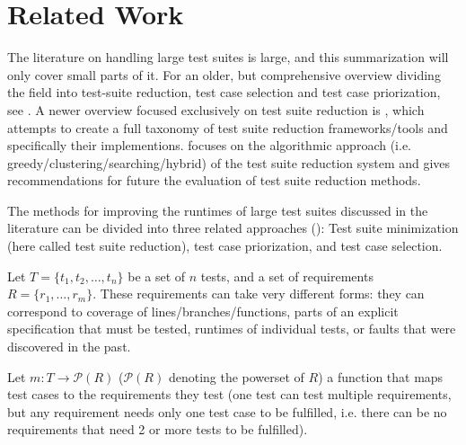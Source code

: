 
\chapter{Related Work}\label{chapter:related}


The literature on handling large test suites is large, and this
summarization will only cover small parts of it. For an older,
but comprehensive overview dividing the field into test-suite
reduction, test case selection and test case priorization, see
\cite{yoo2012regression}. A newer overview focused exclusively on test
suite reduction is \cite{khan2016survey}, which attempts to create a
full taxonomy of test suite reduction frameworks/tools and specifically
their implementions. \cite{khan2018systematic} focuses on the algorithmic
approach (i.e. greedy/clustering/searching/hybrid) of the test suite
reduction system and gives recommendations for future the evaluation of
test suite reduction methods.

The methods for improving the runtimes of large test suites discussed
in the literature can be divided into three related approaches
(\cite{yoo2012regression}): Test suite minimization (here called test
suite reduction), test case priorization, and test case selection.



Let $T=\{t_1, t_2, \dots, t_n\}$ be a set of $n$ tests, and a
set of requirements $R=\{r_1, \dots, r_m\}$. These requirements
can take very different forms: they can correspond to coverage of
lines/branches/functions, parts of an explicit specification that must
be tested, runtimes of individual tests, or faults that were discovered
in the past.

Let $m: T \rightarrow \mathcal{P}(R)$ ($\mathcal{P}(R)$ denoting the
powerset of $R$) a function that maps test cases to the requirements they
test (one test can test multiple requirements, but any requirement needs
only one test case to be fulfilled, i.e. there can be no requirements
that need 2 or more tests to be fulfilled).

